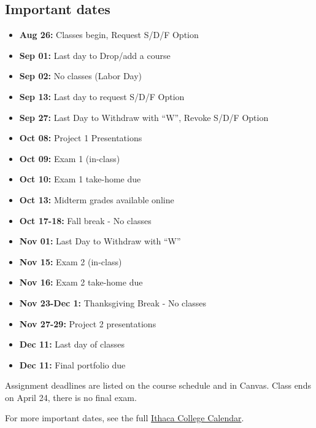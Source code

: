 \documentclass[
  letterpaper,
  DIV=11,
  numbers=noendperiod]{scrartcl}
\begin{document}
\subsection{Important dates}\label{important-dates}

\begin{itemize}
\item
  \textbf{Aug 26:} Classes begin, Request S/D/F Option
\item
  \textbf{Sep 01:} Last day to Drop/add a course
\item
  \textbf{Sep 02:} No classes (Labor Day)
\item
  \textbf{Sep 13:} Last day to request S/D/F Option
\item
  \textbf{Sep 27:} Last Day to Withdraw with ``W'', Revoke S/D/F Option
\item
  \textbf{Oct 08:} Project 1 Presentations
\item
  \textbf{Oct 09:} Exam 1 (in-class)
\item
  \textbf{Oct 10:} Exam 1 take-home due
\item
  \textbf{Oct 13:} Midterm grades available online
\item
  \textbf{Oct 17-18:} Fall break - No classes
\item
  \textbf{Nov 01:} Last Day to Withdraw with ``W''
\item
  \textbf{Nov 15:} Exam 2 (in-class)
\item
  \textbf{Nov 16:} Exam 2 take-home due
\item
  \textbf{Nov 23-Dec 1:} Thanksgiving Break - No classes
\item
  \textbf{Nov 27-29:} Project 2 presentations
\item
  \textbf{Dec 11:} Last day of classes
\item
  \textbf{Dec 11:} Final portfolio due
\end{itemize}

Assignment deadlines are listed on the course schedule and in Canvas.
Class ends on April 24, there is no final exam.

For more important dates, see the full
\href{https://www.ithaca.edu/academics/registrar/academic-calendars}{Ithaca
College Calendar}.
\end{document}
